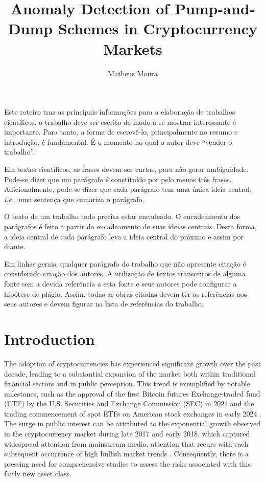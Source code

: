 \documentclass[12pt]{article}
\title{Anomaly Detection of Pump-and-Dump Schemes in Cryptocurrency Markets}
\author{Matheus Moura\inst{1}}
\begin{document}
 
	
	\maketitle
	
	\begin{resumo} 
		Este roteiro traz as principais informações para a elaboração de trabalhos científicos. o trabalho deve ser escrito de modo a se mostrar interessante e importante. Para tanto, a forma de escrevê-lo, principalmente no resumo e  introdução, é fundamental. É o momento no qual o autor deve ``vender o trabalho''. 
		
		Em textos científicos, as frases devem ser curtas, para não gerar ambiguidade. Pode-se dizer que um parágrafo é constituído por pelo menos três frases. Adicionalmente, pode-se dizer que cada parágrafo tem uma única ideia central, \emph{i.e.}, uma sentença  que sumariza o parágrafo. 
		
		O texto de um trabalho todo precisa estar encadeado. O encadeamento dos parágrafos é feito a partir do encadeamento de suas ideias centrais. Desta forma, a ideia central de cada parágrafo leva a ideia central do próximo e assim por diante. 
		
		Em linhas gerais, qualquer parágrafo do trabalho que não apresente citação é considerado criação dos autores. A utilização de textos transcritos de alguma fonte sem a devida referência a esta fonte e seus autores pode configurar a hipótese de plágio. Assim, todas as obras citadas devem ter as referências aos seus autores e devem figurar na lista de referências do trabalho.
	\end{resumo}
	
	\section{Introduction}
	\label{sec_introducao}

	The adoption of cryptocurrencies has experienced significant growth over the past decade, leading to a substantial expansion of the market both within traditional financial sectors and in public perception.
	This trend is exemplified by notable milestones, such as the approval of the first Bitcoin futures Exchange-traded fund (ETF) by the U.S. Securities and Exchange Commission (SEC) in 2021 \citep{wursthorn2021} and the trading commencement of spot ETFs on American stock exchanges in early 2024 \citep{schmitt2024}.
	The surge in public interest can be attributed to the exponential growth observed in the cryptocurrency market during late 2017 and early 2018, which captured widespread attention from mainstream media, attention that recurs with each subsequent occurrence of high bullish market trends \citep{steinmetz2021}.
	Consequently, there is a pressing need for comprehensive studies to assess the risks associated with this fairly new asset class.
\end{document}
